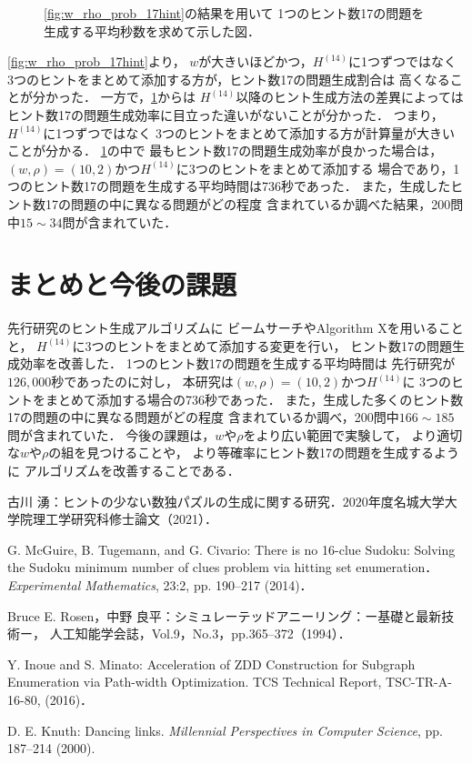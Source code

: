 \documentclass[a4paper, 9pt]{jarticle}
\begin{document}
\begin{論文概要}
\begin{figure}[bt]
  \caption{\figurename{\ref{fig:w_rho_prob_17hint}}の結果を用いて
  1つのヒント数17の問題を生成する平均秒数を求めて示した図．} 
  \label{fig:w_rho_efficiency_17hint}
\end{figure}
\figurename{\ref{fig:w_rho_prob_17hint}}より，
$w$が大きいほどかつ，$H^{(14)}$に1つずつではなく
3つのヒントをまとめて添加する方が，ヒント数17の問題生成割合は
高くなることが分かった．
一方で，\figurename{\ref{fig:w_rho_efficiency_17hint}}からは
$H^{(14)}$以降のヒント生成方法の差異によっては
ヒント数17の問題生成効率に目立った違いがないことが分かった．
つまり，$H^{(14)}$に1つずつではなく
3つのヒントをまとめて添加する方が計算量が大きいことが分かる．
\figurename{\ref{fig:w_rho_efficiency_17hint}}の中で
最もヒント数17の問題生成効率が良かった場合は，
$(w, \rho) = (10, 2)$かつ$H^{(14)}$に3つのヒントをまとめて添加する
場合であり，1つのヒント数17の問題を生成する平均時間は736秒であった．
また，生成したヒント数17の問題の中に異なる問題がどの程度
含まれているか調べた結果，200問中$15 \sim 34$問が含まれていた．

\section{まとめと今後の課題}
先行研究のヒント生成アルゴリズムに
ビームサーチやAlgorithm Xを用いることと，
$H^{(14)}$に3つのヒントをまとめて添加する変更を行い，
ヒント数17の問題生成効率を改善した．
1つのヒント数17の問題を生成する平均時間は
先行研究が$126,000$秒であったのに対し，
本研究は$(w, \rho) = (10, 2)$かつ$H^{(14)}$に
3つのヒントをまとめて添加する場合の736秒であった．
また，生成した多くのヒント数17の問題の中に異なる問題がどの程度
含まれているか調べ，200問中$166 \sim 185$問が含まれていた．
今後の課題は，$w$や$\rho$をより広い範囲で実験して，
より適切な$w$や$\rho$の組を見つけることや，
より等確率にヒント数17の問題を生成するように
アルゴリズムを改善することである．

\begin{thebibliography}{10}

  古川 湧：ヒントの少ない数独パズルの生成に関する研究．$2020$年度名城大学大学院理工学研究科修士論文（2021）．

  G. McGuire, B. Tugemann, and G. Civario:
  There is no 16-clue Sudoku: Solving the Sudoku minimum number of clues problem via hitting set enumeration．
  {\it Experimental Mathematics}, 23:2, pp. 190--217 (2014)．

  Bruce E. Rosen，中野 良平：シミュレーテッドアニーリング：ー基礎と最新技術ー，
  人工知能学会誌，Vol.9，No.3，pp.365--372（1994）．
  
  Y. Inoue and S. Minato: Acceleration of ZDD Construction for Subgraph 
  Enumeration via Path-width Optimization. TCS Technical Report, 
  TSC-TR-A-16-80, (2016)．

  D. E. Knuth: Dancing links. 
  {\it Millennial Perspectives in Computer Science}, pp. 187--214 (2000).
  
\end{thebibliography}

\end{論文概要} %
\end{document}
